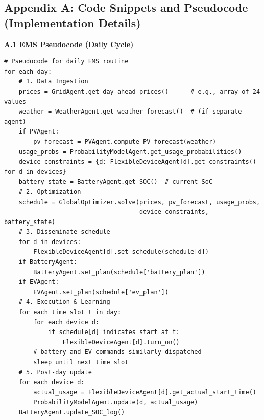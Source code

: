 \documentclass[12pt,a4paper]{article}
\begin{document}
\subsection*{Appendix A: Code Snippets and Pseudocode (Implementation Details)}
\noindent \textbf{A.1 EMS Pseudocode (Daily Cycle)}
\begin{verbatim}
# Pseudocode for daily EMS routine
for each day:
    # 1. Data Ingestion
    prices = GridAgent.get_day_ahead_prices()      # e.g., array of 24 values
    weather = WeatherAgent.get_weather_forecast()  # (if separate agent)
    if PVAgent:
        pv_forecast = PVAgent.compute_PV_forecast(weather)
    usage_probs = ProbabilityModelAgent.get_usage_probabilities()
    device_constraints = {d: FlexibleDeviceAgent[d].get_constraints() for d in devices}
    battery_state = BatteryAgent.get_SOC()  # current SoC
    # 2. Optimization
    schedule = GlobalOptimizer.solve(prices, pv_forecast, usage_probs,
                                     device_constraints, battery_state)
    # 3. Disseminate schedule
    for d in devices:
        FlexibleDeviceAgent[d].set_schedule(schedule[d])
    if BatteryAgent:
        BatteryAgent.set_plan(schedule['battery_plan'])
    if EVAgent:
        EVAgent.set_plan(schedule['ev_plan'])
    # 4. Execution & Learning
    for each time slot t in day:
        for each device d:
            if schedule[d] indicates start at t:
                FlexibleDeviceAgent[d].turn_on()
        # battery and EV commands similarly dispatched
        sleep until next time slot
    # 5. Post-day update
    for each device d:
        actual_usage = FlexibleDeviceAgent[d].get_actual_start_time()
        ProbabilityModelAgent.update(d, actual_usage)
    BatteryAgent.update_SOC_log()
\end{verbatim}
\end{document}
